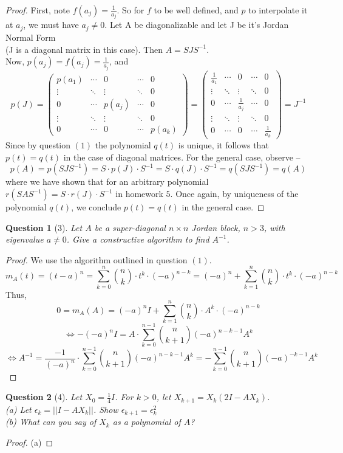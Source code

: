 \documentclass[11pt]{article}
\theoremstyle{quest}
\newtheorem*{question}{Question}
\begin{document}
\begin{proof}
First, note $f(a_j) = \frac{1}{a_j}$. So for $f$ to be well defined, and $p$ to interpolate it at $a_j$, we must have $a_j \ne 0$. Let A be diagonalizable and let J be it's Jordan Normal Form \\(J is a diagonal matrix in this case). Then $A = SJS^{-1}$. \\Now, $p(a_j) = f(a_j) = \frac{1}{a_j}$, and
$$p(J) = \begin{pmatrix}
p(a_1) & \cdots & 0 & \cdots & 0 \\
\vdots & \ddots & \vdots & \ddots  & 0 \\
0 & \cdots & p(a_j) & \cdots & 0 \\
\vdots & \ddots & \vdots & \ddots & 0 \\
0 & \cdots & 0 & \cdots & p(a_k)
\end{pmatrix} = \begin{pmatrix}
\frac{1}{a_1} & \cdots & 0 & \cdots & 0 \\
\vdots & \ddots & \vdots & \ddots  & 0 \\
0 & \cdots & \frac{1}{a_j} & \cdots & 0 \\
\vdots & \ddots & \vdots & \ddots & 0 \\
0 & \cdots & 0 & \cdots & \frac{1}{a_k}
\end{pmatrix} = J^{-1}$$
Since by question $(1)$ the polynomial $q(t)$ is unique, it follows that $p(t) = q(t)$ in the case of diagonal matrices. For the general case, observe --
$$p(A) = p(SJS^{-1}) = S\cdot p(J)\cdot S^{-1} = S\cdot q(J)\cdot S^{-1} = q(SJS^{-1}) = q(A)$$
where we have shown that for an arbitrary polynomial $r(SAS^{-1}) = S\cdot r(J)\cdot S^{-1}$ in homework $5$. Once again, by uniqueness of the polynomial $q(t)$, we conclude $p(t) = q(t)$ in the general case.
\end{proof}
\begin{question}[3]
Let $A$ be a super-diagonal $n \times n$ Jordan block, $n > 3$, with eigenvalue $a \ne 0$. Give a constructive algorithm to find $A^{-1}$.
\end{question}
\begin{proof}
We use the algorithm outlined in question $(1)$.
$$m_A(t) = (t-a)^n = \sum_{k=0}^n \binom{n}{k} \cdot t^k \cdot (-a)^{n-k} = (-a)^n + \sum_{k=1}^n \binom{n}{k} \cdot t^k \cdot (-a)^{n-k}$$
Thus,
$$0 = m_A(A) = (-a)^nI + \sum_{k=1}^n \binom{n}{k} \cdot A^k \cdot (-a)^{n-k}$$
$$\iff -(-a)^nI = A \cdot \sum_{k=0}^{n-1} \binom{n}{k+1} (-a)^{n-k-1} A^k$$
$$\iff A^{-1} = \frac{-1}{(-a)^n} \cdot \sum_{k=0}^{n-1} \binom{n}{k+1} (-a)^{n-k-1} A^k = - \sum_{k=0}^{n-1} \binom{n}{k+1}(-a)^{-k-1} A^k$$
\end{proof}
\begin{question}[4]
Let $X_0 = \frac{1}{4}I$. For $k > 0$, let $X_{k+1} = X_k(2I - AX_k)$.
\\(a) Let $\epsilon_k = ||I - AX_k||$. Show $\epsilon_{k+1} = \epsilon_k^2$
\\(b) What can you say of $X_k$ as a polynomial of $A$?
\end{question}
\begin{proof}
(a)
\end{proof}
\end{document}
